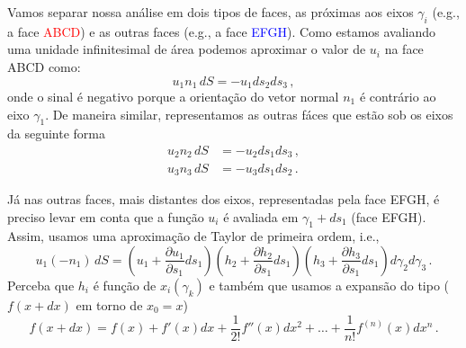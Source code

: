 Vamos separar nossa an\'alise em dois tipos de faces, as pr\'oximas aos eixos
$\gamma_{i}$ (e.g., a face \textcolor{red}{ABCD}) e as outras faces (e.g., a
face \textcolor{blue}{EFGH}).
Como estamos avaliando uma unidade infinitesimal de \'area podemos aproximar o valor de
$u_i$ na face ABCD como:
\begin{equation}
u_1n_1\,dS=-u_{1}ds_{2}ds_{3}\, ,
\end{equation}
onde o sinal \'e negativo porque a orienta\c{c}\~ao do vetor normal $n_1$ \'e
contr\'ario ao eixo $\gamma_1$. De maneira similar, representamos as outras
f\'aces que est\~ao sob os eixos da seguinte forma
\begin{align}
  u_2n_2\,dS&=-u_{2}ds_{1}ds_{3}\, , \\
  u_3n_3\,dS&=-u_{3}ds_{1}ds_{2}\, .
\end{align}

J\'a nas outras faces, mais distantes dos eixos, representadas pela face EFGH,
\'e preciso levar em conta que a fun\c{c}\~ao $u_i$ \'e avaliada em
$\gamma_1+ds_1$  (face EFGH). Assim, usamos uma aproxima\c{c}\~ao
de Taylor de primeira ordem, i.e.,
\begin{equation}
  u_1(-n_1)\,dS = \left(u_1 + \frac{\partial u_1}{\partial s_1}ds_1\right)
  \left(h_2 + \frac{\partial h_2}{\partial s_1}ds_1\right)
  \left(h_3 + \frac{\partial h_3}{\partial
  s_1}ds_1\right)d\gamma_2d\gamma_3\, .
  \label{eq:taylorface}
\end{equation}
Perceba que $h_i$ \'e fun\c{c}\~ao de $x_i(\gamma_k)$ e tamb\'em que usamos a expans\~ao do tipo
($f(x+dx)$ em torno de $x_0 = x$)
\begin{equation}
  f(x+dx) = f(x) + f'(x)dx + \frac{1}{2!}f''(x)dx^2 + \dots
  +\frac{1}{n!}f^{(n)}(x)dx^n \, .
\end{equation}

